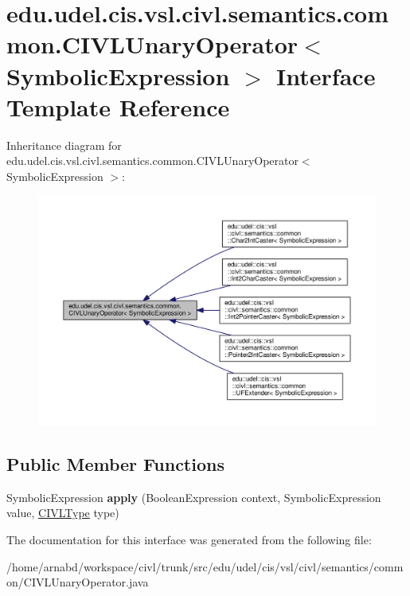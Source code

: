 \hypertarget{interfaceedu_1_1udel_1_1cis_1_1vsl_1_1civl_1_1semantics_1_1common_1_1CIVLUnaryOperator}{}\section{edu.\+udel.\+cis.\+vsl.\+civl.\+semantics.\+common.\+C\+I\+V\+L\+Unary\+Operator$<$ Symbolic\+Expression $>$ Interface Template Reference}
\label{interfaceedu_1_1udel_1_1cis_1_1vsl_1_1civl_1_1semantics_1_1common_1_1CIVLUnaryOperator}


Inheritance diagram for edu.\+udel.\+cis.\+vsl.\+civl.\+semantics.\+common.\+C\+I\+V\+L\+Unary\+Operator$<$ Symbolic\+Expression $>$\+:
\nopagebreak
\begin{figure}[H]
\begin{center}
\leavevmode
\includegraphics[width=350pt]{interfaceedu_1_1udel_1_1cis_1_1vsl_1_1civl_1_1semantics_1_1common_1_1CIVLUnaryOperator__inherit__graph}
\end{center}
\end{figure}
\subsection*{Public Member Functions}
\begin{DoxyCompactItemize}
\item 
\hypertarget{interfaceedu_1_1udel_1_1cis_1_1vsl_1_1civl_1_1semantics_1_1common_1_1CIVLUnaryOperator_ab3bb57decb6302c062f3f44131c1bede}{}Symbolic\+Expression {\bfseries apply} (Boolean\+Expression context, Symbolic\+Expression value, \hyperlink{interfaceedu_1_1udel_1_1cis_1_1vsl_1_1civl_1_1model_1_1IF_1_1type_1_1CIVLType}{C\+I\+V\+L\+Type} type)\label{interfaceedu_1_1udel_1_1cis_1_1vsl_1_1civl_1_1semantics_1_1common_1_1CIVLUnaryOperator_ab3bb57decb6302c062f3f44131c1bede}

\end{DoxyCompactItemize}


The documentation for this interface was generated from the following file\+:\begin{DoxyCompactItemize}
\item 
/home/arnabd/workspace/civl/trunk/src/edu/udel/cis/vsl/civl/semantics/common/C\+I\+V\+L\+Unary\+Operator.\+java\end{DoxyCompactItemize}
